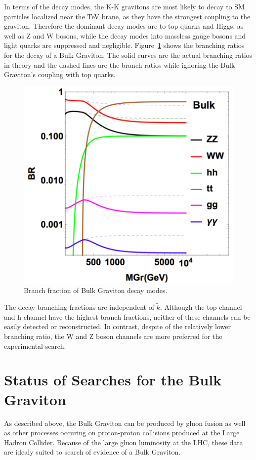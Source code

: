 In terms of the decay modes, the K-K gravitons are most likely to decay to SM particles localized near the TeV brane, as they have the strongest coupling to the graviton. Therefore the dominant decay modes are to top quarks and Higgs, as well as Z and W bosons, while the decay modes into massless gauge bosons and light quarks are suppressed and negligible. Figure~\ref{fig:intro_Gbr} shows the branching ratios for the decay of a Bulk Graviton. The solid curves are the actual branching ratios in theory and the dashed lines are the branch ratios while ignoring the Bulk Graviton's coupling with top quarks.
\begin{figure}[htbp]
\begin{center}
\includegraphics[width=0.5\linewidth]{figures/intro_Gbr.png}
\caption{Branch fraction of Bulk Graviton decay modes.}
\label{fig:intro_Gbr}
\end{center}
\end{figure}
The decay branching fractions are independent of $\tilde{k}$. Although the top channel and h channel have the highest branch fractions, neither of these channels can be easily detected or reconstructed. In contrast, despite of the relatively lower branching ratio, the W and Z boson channels are more preferred for the experimental search.

\section{Status of Searches for the Bulk Graviton} 
As described above, the Bulk Graviton can be produced by gluon fusion as well as other processes occuring on proton-proton collisions produced at the Large Hadron Collider. Because of the large gluon luminosity at the LHC, these data are idealy suited to search of evidence of a Bulk Graviton.
